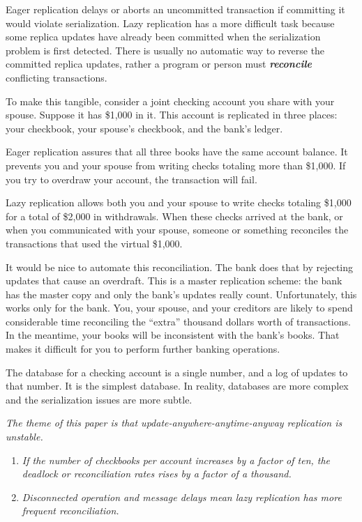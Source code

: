 \documentclass[a4paper,11pt,twoside,openright]{article}
\begin{document}
Eager replication delays or aborts an uncommitted transaction if
committing it would violate serialization. Lazy replication has a more
difficult task because some replica updates have already been committed
when the serialization problem is first detected. There is usually no
automatic way to reverse the committed replica updates, rather a program
or person must \emph{\textbf{reconcile}} conflicting transactions.

To make this tangible, consider a joint checking account you share with
your spouse. Suppose it has \$1,000 in it. This account is replicated in
three places: your checkbook, your spouse's checkbook, and the bank's
ledger.

Eager replication assures that all three books have the same account
balance. It prevents you and your spouse from writing checks totaling
more than \$1,000. If you try to overdraw your account, the transaction
will fail.

Lazy replication allows both you and your spouse to write checks
totaling \$1,000 for a total of \$2,000 in withdrawals. When these
checks arrived at the bank, or when you communicated with your spouse,
someone or something reconciles the transactions that used the virtual
\$1,000.

It would be nice to automate this reconciliation. The bank does that by
rejecting updates that cause an overdraft. This is a master replication
scheme: the bank has the master copy and only the bank's updates really
count. Unfortunately, this works only for the bank. You, your spouse,
and your creditors are likely to spend considerable time reconciling the
``extra'' thousand dollars worth of transactions. In the meantime, your
books will be inconsistent with the bank's books. That makes it
difficult for you to perform further banking operations.

The database for a checking account is a single number, and a log of
updates to that number. It is the simplest database. In reality,
databases are more complex and the serialization issues are more subtle.

\emph{The theme of this paper is that update-anywhere-anytime-anyway
replication is unstable. }

\begin{enumerate}
\def\labelenumi{\arabic{enumi}.}
\item
  \emph{If the number of checkbooks per account increases by a factor of
  ten, the deadlock or reconciliation rates rises by a factor of a
  thousand.}
\item
  \emph{Disconnected operation and message delays mean lazy replication
  has more frequent reconciliation.}
\end{enumerate}
\end{document}
